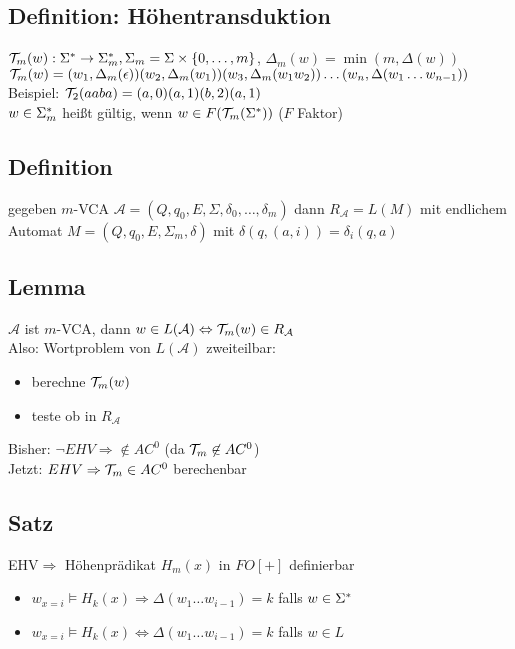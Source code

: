     \subsection{Definition: Höhentransduktion}
        $\mathcal{T}_m(w):\Sigma^*\rightarrow\Sigma^*_m, \Sigma_m=\Sigma\times\{0,\dots,m\}$, $\Delta_m(w)=\min(m,\Delta(w))$\\
        $\mathcal{T}_m(w)=(w_1,\Delta_m(\epsilon))(w_2,\Delta_m(w_1))(w_3,\Delta_m(w_1w_2))\dots(w_n,\Delta(w_1\dots w_{n-1}))$\\[1mm]
        Beispiel: $\mathcal{T}_2(aaba)=(a,0)(a,1)(b,2)(a,1)$\\[1mm]
        $w\in\Sigma^*_m$ heißt gültig, wenn $w\in F(\mathcal{T}_m(\Sigma^*))$ ($F$ Faktor)
    \subsection{Definition}
        gegeben $m$-VCA $\mathcal{A}=(Q,q_0,E,\Sigma,\delta_0,\dots,\delta_m)$ dann $R_\mathcal{A}=L(M)$ mit endlichem Automat $M=(Q,q_0,E,\Sigma_m,\delta)$ mit $\delta(q,(a,i))=\delta_i(q,a)$
    \subsection{Lemma}
        $\mathcal{A}$ ist $m$-VCA, dann $w\in L(\mathcal{A})\Leftrightarrow\mathcal{T}_m(w)\in R_\mathcal{A}$\\
        Also: Wortproblem von $L(\mathcal{A})$ zweiteilbar:
        \begin{itemize}
            \item berechne $\mathcal{T}_m(w)$
            \item teste ob in $R_\mathcal{A}$
        \end{itemize}
        Bisher: $\neg EHV\Rightarrow\not\in AC^0$ (da $\mathcal{T}_m\not\in AC^0$)\\
        Jetzt: $EHV\Rightarrow \mathcal{T}_m\in AC^0$ berechenbar
    \subsection{Satz}
        EHV$\Rightarrow$ Höhenprädikat $H_m(x)$ in $FO[+]$ definierbar
        \begin{itemize}
            \item $w_{x=i}\models H_k(x)\Rightarrow\Delta(w_1\dots w_{i-1})=k$ falls $w\in\Sigma^*$
            \item $w_{x=i}\models H_k(x)\Leftrightarrow\Delta(w_1\dots w_{i-1})=k$ falls $w\in L$
        \end{itemize}
